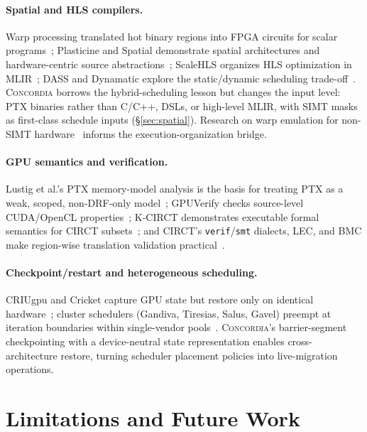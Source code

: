 \documentclass[sigplan,nonacm]{acmart}
\newcommand{\sys}{\textsc{Concordia}\xspace}
\begin{document}
\paragraph{Spatial and HLS compilers.} Warp processing translated hot
binary regions into FPGA circuits for scalar programs~\cite{vahid2008warp};
Plasticine and Spatial demonstrate spatial architectures and
hardware-centric source abstractions~\cite{prabhakar2017plasticine,
koeplinger2018spatial}; ScaleHLS organizes HLS optimization in
MLIR~\cite{ye2021scalehls}; DASS and Dynamatic explore the
static/dynamic scheduling trade-off~\cite{cheng2022dass,
josipovic2020dynamatic}.  \sys borrows the hybrid-scheduling lesson but
changes the input level: PTX binaries rather than C/C++, DSLs, or high-level
MLIR, with SIMT masks as first-class schedule inputs
(\S\ref{sec:spatial}).  Research on warp emulation for non-SIMT
hardware~\cite{bauer2014singe,wang2019ffgs} informs the execution-organization
bridge.

\paragraph{GPU semantics and verification.} Lustig et al.'s PTX memory-model
analysis is the basis for treating PTX as a weak, scoped, non-DRF-only
model~\cite{lustig2019ptxmemory}; GPUVerify checks source-level CUDA/OpenCL
properties~\cite{donaldson2014gpuverify}; K-CIRCT demonstrates executable
formal semantics for CIRCT subsets~\cite{zhao2024kcirct}; and CIRCT's
\texttt{verif}/\texttt{smt} dialects, LEC, and BMC make region-wise
translation validation practical~\cite{circt_verif,circt_tools,circt_bmc,
circt_smt}.

\paragraph{Checkpoint/restart and heterogeneous scheduling.} CRIUgpu and
Cricket capture GPU state but restore only on identical
hardware~\cite{lee2019gpusnapshot,nukada2023checkpoint}; cluster schedulers
(Gandiva, Tiresias, Salus, Gavel) preempt at iteration boundaries within
single-vendor pools~\cite{xiao2018gandiva,gu2019tiresias,yu2020salus,
narayanan2020gavel}.  \sys's barrier-segment checkpointing with a
device-neutral state representation enables cross-architecture restore,
turning scheduler placement policies into live-migration operations.

\section{Limitations and Future Work}
\label{sec:limitations}
\end{document}
